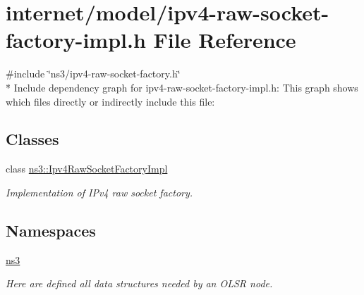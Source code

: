 \hypertarget{ipv4-raw-socket-factory-impl_8h}{}\section{internet/model/ipv4-\/raw-\/socket-\/factory-\/impl.h File Reference}
\label{ipv4-raw-socket-factory-impl_8h}
{\ttfamily \#include \char`\"{}ns3/ipv4-\/raw-\/socket-\/factory.\+h\char`\"{}}\\*
Include dependency graph for ipv4-\/raw-\/socket-\/factory-\/impl.h\+:
This graph shows which files directly or indirectly include this file\+:
\subsection*{Classes}
\begin{DoxyCompactItemize}
\item 
class \hyperlink{classns3_1_1Ipv4RawSocketFactoryImpl}{ns3\+::\+Ipv4\+Raw\+Socket\+Factory\+Impl}
\begin{DoxyCompactList}\small\item\em Implementation of I\+Pv4 raw socket factory. \end{DoxyCompactList}\end{DoxyCompactItemize}
\subsection*{Namespaces}
\begin{DoxyCompactItemize}
\item 
 \hyperlink{namespacens3}{ns3}
\begin{DoxyCompactList}\small\item\em Here are defined all data structures needed by an O\+L\+SR node. \end{DoxyCompactList}\end{DoxyCompactItemize}
